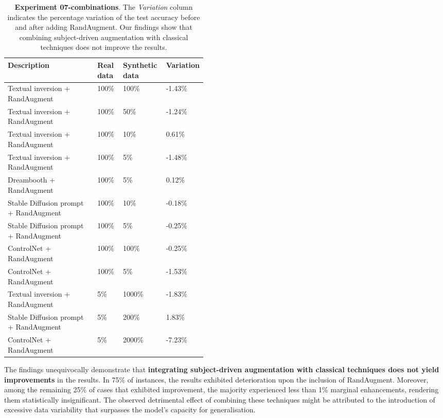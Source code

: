 \begin{table}[ht]
\centering
\begin{tabular}{|p{0.45\linewidth}|l|l|l|}
\hline
\cellcolor[HTML]{BFBFBF}\textbf{Description} & \cellcolor[HTML]{BFBFBF}\textbf{Real   data} & \cellcolor[HTML]{BFBFBF}\textbf{Synthetic   data} & \cellcolor[HTML]{BFBFBF}\textbf{Variation} \\ \hline
Textual inversion + RandAugment & 100\% & 100\% & -1.43\% \\ \hline
Textual inversion + RandAugment & 100\% & 50\% & -1.24\% \\ \hline
Textual inversion + RandAugment & 100\% & 10\% & 0.61\% \\ \hline
Textual inversion + RandAugment & 100\% & 5\% & -1.48\% \\ \hline
Dreambooth + RandAugment & 100\% & 5\% & 0.12\% \\ \hline
Stable Diffusion prompt + RandAugment & 100\% & 10\% & -0.18\% \\ \hline
Stable Diffusion prompt + RandAugment & 100\% & 5\% & -0.25\% \\ \hline
ControlNet + RandAugment & 100\% & 100\% & -0.25\% \\ \hline
ControlNet + RandAugment & 100\% & 5\% & -1.53\% \\ \hline
Textual inversion + RandAugment & 5\% & 1000\% & -1.83\% \\ \hline
Stable Diffusion prompt + RandAugment & 5\% & 200\% & 1.83\% \\ \hline
ControlNet + RandAugment & 5\% & 2000\% & -7.23\% \\ \hline
\end{tabular}
\caption{\textbf{Experiment 07-combinations}. The \textit{Variation} column indicates the percentage variation of the test accuracy before and after adding RandAugment. Our findings show that combining subject-driven augmentation with classical techniques does not improve the results.}
\label{table:TableExp07}
\end{table}

The findings unequivocally demonstrate that \textbf{integrating subject-driven augmentation with classical techniques does not yield improvements} in the results. In 75\% of instances, the results exhibited deterioration upon the inclusion of RandAugment. Moreover, among the remaining 25\% of cases that exhibited improvement, the majority experienced less than 1\% marginal enhancements, rendering them statistically insignificant. The observed detrimental effect of combining these techniques might be attributed to the introduction of excessive data variability that surpasses the model's capacity for generalisation.


